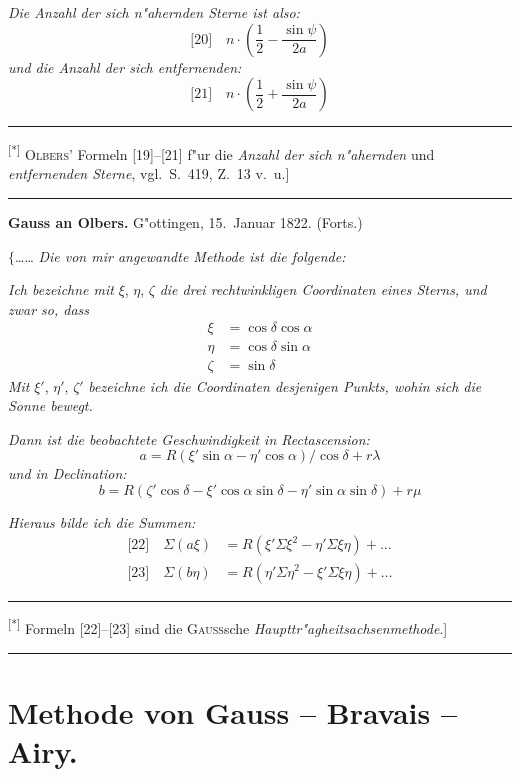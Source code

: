 \documentclass[12pt,a4paper]{article}
\theoremstyle{plain}
\theoremstyle{definition}
\theoremstyle{remark}
\begin{document}
{\itshape Die Anzahl der sich n"ahernden Sterne ist also:}
\[
\text{[20]}\quad n \cdot \left(\frac{1}{2} - \frac{\sin\psi}{2a}\right)
\]
{\itshape und die Anzahl der sich entfernenden:}
\[
\text{[21]}\quad n \cdot \left(\frac{1}{2} + \frac{\sin\psi}{2a}\right)
\]

\rule{\textwidth}{0.4pt}
{\small
\textsuperscript{[*]} \textsc{Olbers'} Formeln [19]--[21] f"ur die {\itshape Anzahl der sich n"ahernden} und {\itshape entfernenden Sterne}, vgl.\ S.\ 419, Z.\ 13 v.\ u.]
}
\rule{\textwidth}{0.4pt}

\vspace{1em}
\begin{center}
\textbf{Gauss an Olbers.} \quad G"ottingen, 15.\ Januar 1822. (Forts.)
\end{center}

\noindent
$\{$\ldots{}\ldots{} {\itshape Die von mir angewandte Methode ist die folgende:}

{\itshape Ich bezeichne mit} $\xi$, $\eta$, $\zeta$ {\itshape die drei rechtwinkligen Coordinaten eines Sterns, und zwar so, dass}
\begin{align*}
\xi &= \cos\delta\cos\alpha\\
\eta &= \cos\delta\sin\alpha\\
\zeta &= \sin\delta
\end{align*}
{\itshape Mit} $\xi'$, $\eta'$, $\zeta'$ {\itshape bezeichne ich die Coordinaten desjenigen Punkts, wohin sich die Sonne bewegt.}

{\itshape Dann ist die beobachtete Geschwindigkeit in Rectascension:}
\[
a = R(\xi'\sin\alpha - \eta'\cos\alpha)/\cos\delta + r\lambda
\]
{\itshape und in Declination:}
\[
b = R(\zeta'\cos\delta - \xi'\cos\alpha\sin\delta - \eta'\sin\alpha\sin\delta) + r\mu
\]

{\itshape Hieraus bilde ich die Summen:}
\begin{align*}
\text{[22]}\quad \Sigma(a\xi) &= R(\xi'\Sigma\xi^2 - \eta'\Sigma\xi\eta) + \ldots\\
\text{[23]}\quad \Sigma(b\eta) &= R(\eta'\Sigma\eta^2 - \xi'\Sigma\xi\eta) + \ldots
\end{align*}

\rule{\textwidth}{0.4pt}
{\small
\textsuperscript{[*]} Formeln [22]--[23] sind die \textsc{Gau\ss}sche {\itshape Haupttr"agheitsachsenmethode}.]
}
\rule{\textwidth}{0.4pt}


\newpage
\section*{Methode von Gauss -- Bravais -- Airy.}
\end{document}
